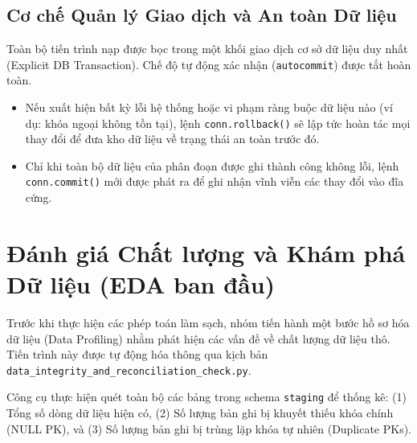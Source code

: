 \documentclass[12pt, a4paper]{report}
\begin{document}
\subsection{Cơ chế Quản lý Giao dịch và An toàn Dữ liệu}
Toàn bộ tiến trình nạp được bọc trong một khối giao dịch cơ sở dữ liệu duy nhất (Explicit DB Transaction). Chế độ tự động xác nhận (\texttt{autocommit}) được tắt hoàn toàn. 
\begin{itemize}
    \item Nếu xuất hiện bất kỳ lỗi hệ thống hoặc vi phạm ràng buộc dữ liệu nào (ví dụ: khóa ngoại không tồn tại), lệnh \texttt{conn.rollback()} sẽ lập tức hoàn tác mọi thay đổi để đưa kho dữ liệu về trạng thái an toàn trước đó.
    \item Chỉ khi toàn bộ dữ liệu của phân đoạn được ghi thành công không lỗi, lệnh \texttt{conn.commit()} mới được phát ra để ghi nhận vĩnh viễn các thay đổi vào đĩa cứng.
\end{itemize}

\section{Đánh giá Chất lượng và Khám phá Dữ liệu (EDA ban đầu)}
\label{sec:data_quality}

Trước khi thực hiện các phép toán làm sạch, nhóm tiến hành một bước hồ sơ hóa dữ liệu (Data Profiling) nhằm phát hiện các vấn đề về chất lượng dữ liệu thô. Tiến trình này được tự động hóa thông qua kịch bản \texttt{data\_integrity\_and\_reconciliation\_check.py}. 

Công cụ thực hiện quét toàn bộ các bảng trong schema \texttt{staging} để thống kê: (1) Tổng số dòng dữ liệu hiện có, (2) Số lượng bản ghi bị khuyết thiếu khóa chính (NULL PK), và (3) Số lượng bản ghi bị trùng lặp khóa tự nhiên (Duplicate PKs). 
\end{document}
